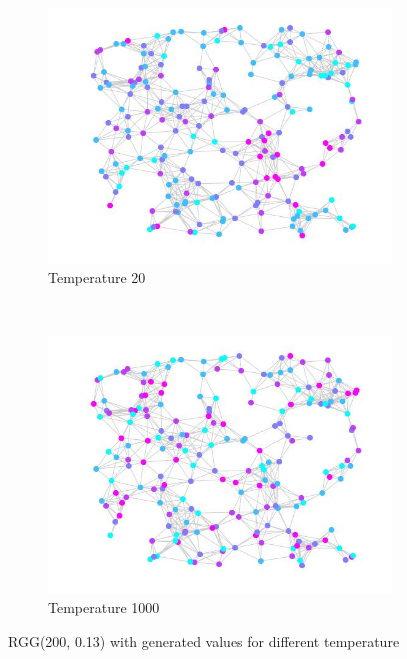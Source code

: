 \documentclass[12pt]{report}
\begin{document}
\begin{figure}[t]
    \begin{subfigure}[b]{0.4\textwidth}
        \includegraphics[width=\textwidth]{rggT20}
        \caption{Temperature 20}

    \end{subfigure}   
    ~ 
    \begin{subfigure}[b]{0.4\textwidth}
        \includegraphics[width=\textwidth]{rggT1000}
        \caption{Temperature 1000}

    \end{subfigure}
    
    \caption{RGG(200, 0.13) with generated values for different temperature}
    \label{fig:testGibbs}
\end{figure}
\end{document}
